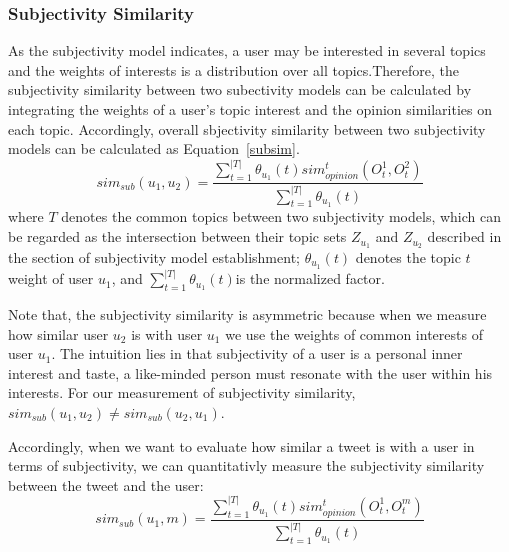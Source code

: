 \documentclass{acm_proc_article-sp}
\begin{document}
\subsubsection{Subjectivity Similarity}

As the subjectivity model indicates, a user may be interested in several topics and the weights of interests is a distribution over all topics.Therefore, the subjectivity  similarity between two subectivity models can be calculated by integrating the weights of a user's topic interest and the opinion similarities on each topic. Accordingly, overall sbjectivity similarity between two subjectivity models can be calculated as Equation~\ref{subsim}. 
\begin{equation}
\label{subsim}
sim_{sub}(u_{1},u_{2})=\dfrac{\sum_{t=1}^{|T|}\theta_{u_{1}}(t) sim_{opinion}^{t}(O_{t}^{1},O_{t}^{2})}{\sum_{t=1}^{|T|}\theta_{u_{1}}(t)}
\end{equation}
where $ T $ denotes the common topics between two subjectivity models, which can be regarded as the intersection between their topic sets $ Z_{u_{1}} $ and $ Z_{u_{2}} $ described in the section of subjectivity model establishment; $ \theta_{u_{1}}(t) $ denotes the topic $ t $ weight of user $ u_{1} $, and $ \sum_{t=1}^{|T|}\theta_{u_{1}}(t) $is the normalized factor.

Note that, the subjectivity similarity is asymmetric because when we measure how similar user $ u_{2} $ is with user $ u_{1} $ we use the weights of common interests of user $ u_{1} $. The intuition lies in that subjectivity of a user is a personal inner interest and taste, a like-minded person must resonate with the user within his interests. For our measurement of subjectivity similarity, $ sim_{sub}(u_{1},u_{2})\neq sim_{sub}(u_{2},u_{1})$.

Accordingly, when we want to evaluate how similar a tweet is with a user in terms of subjectivity, we can quantitativly measure the subjectivity similarity between the tweet and the user:
\begin{equation}
\label{subtweet}
sim_{sub}(u_{1},m)=\dfrac{\sum_{t=1}^{|T|}\theta_{u_{1}}(t) sim_{opinion}^{t}(O_{t}^{1},O_{t}^{m})}{\sum_{t=1}^{|T|}\theta_{u_{1}}(t)}
\end{equation}
%
\end{document}
